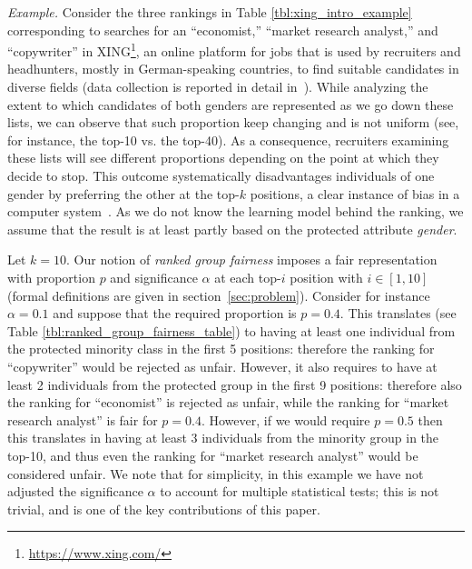 \medskip
\textit{Example.} Consider the three rankings in Table \ref{tbl:xing_intro_example} corresponding to searches for an ``economist,'' ``market research analyst,'' and ``copywriter'' in XING\footnote{\url{https://www.xing.com/}}, an online platform for jobs that is used by recruiters and headhunters, mostly in German-speaking countries, to find suitable candidates in diverse fields (data collection is reported in detail in~\cite{zehlike2017fair}). While analyzing  the extent to which candidates of both genders are represented as we go down these lists,  we can observe that such proportion keep changing and is not uniform (see, for instance, the top-10 vs. the top-40). As a consequence, recruiters examining these lists will see different proportions depending on the point at which they decide to stop.
%
This outcome systematically disadvantages individuals of one gender by preferring the other at the top-$k$ positions, a clear instance of bias in a computer system~\cite{friedman1996bias}. As we do not know the learning model behind the ranking, we assume that the result is at least partly based on the protected attribute \emph{gender}.

Let $k = 10$. Our notion of \textit{ranked group fairness} imposes a fair representation with proportion $p$ and significance $\alpha$ at each top-$i$ position with $i \in [1,10]$ (formal definitions are given in section~\ref{sec:problem}).
Consider for instance $\alpha = 0.1$ and suppose that the required proportion is $p = 0.4$.  This translates (see Table \ref{tbl:ranked_group_fairness_table}) to having at least one individual from the protected minority class in the first 5 positions: therefore the ranking for  ``copywriter'' would be rejected as unfair. However, it also requires to have at least 2 individuals from the protected group in the first 9 positions: therefore also the ranking for ``economist'' is rejected as unfair, while the ranking for ``market research analyst'' is fair for  $p = 0.4$. However, if we would require $p = 0.5$ then this translates in having at least 3 individuals from the minority group in the top-10, and thus even the ranking for ``market research analyst'' would be considered unfair.
%
We note that for simplicity, in this example we have not adjusted the significance $\alpha$ to account for multiple statistical tests; this is not trivial, and is one of the key contributions of this paper.
\medskip

